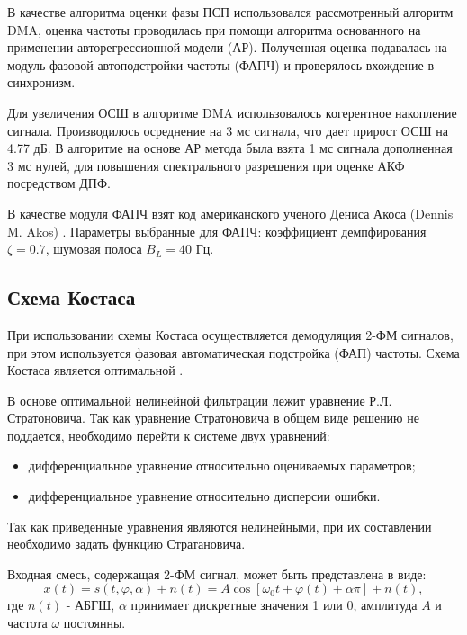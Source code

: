 В качестве алгоритма оценки фазы ПСП использовался
рассмотренный алгоритм DMA, оценка частоты проводилась при помощи алгоритма основанного на применении авторегрессионной модели (АР).
Полученная оценка подавалась на модуль фазовой автоподстройки частоты (ФАПЧ) и проверялось вхождение в синхронизм.

Для увеличения ОСШ в алгоритме DMA использовалось когерентное накопление сигнала. Производилось осреднение на 3 мс сигнала, что дает прирост ОСШ на 4.77 дБ.
В алгоритме на основе АР метода была взята 1 мс сигнала дополненная 3 мс нулей, для повышения спектрального разрешения при оценке АКФ посредством ДПФ.

В качестве модуля ФАПЧ взят код американского ученого Дениса Акоса (Dennis M. Akos) \cite{sandiaproject}.
Параметры выбранные для ФАПЧ: коэффициент демпфирования ${\zeta=0.7}$, шумовая полоса  ${B_L=40}$ Гц. 

\subsection{Схема Костаса}

При использовании схемы Костаса осуществляется демодуляция 2-ФМ сигналов, при этом используется фазовая автоматическая подстройка (ФАП) частоты. Схема
Костаса является оптимальной \cite{shahtarin-wiener-kalman}.

В основе оптимальной нелинейной фильтрации лежит уравнение Р.Л. Стратоновича. Так как уравнение Стратоновича в общем виде решению не поддается, необходимо
перейти к системе двух уравнений:
\begin{itemize}
	\item дифференциальное уравнение относительно оцениваемых параметров;
	\item дифференциальное уравнение относительно дисперсии ошибки.
\end{itemize}

Так как приведенные уравнения являются нелинейными, при их составлении необходимо задать функцию Стратановича.

Входная смесь, содержащая 2-ФМ сигнал, может быть представлена в виде:
\begin{equation}
	x(t) = s(t, \varphi, \alpha) + n(t) = A \cos \left[ \omega_0t + \varphi(t) +\alpha \pi \right] + n(t),
	\label{eq:sec4_sig}
\end{equation}
где ${n(t)}$ - АБГШ, ${\alpha}$ принимает дискретные значения 1 или 0, амплитуда ${A}$ и частота ${\omega}$ постоянны.

